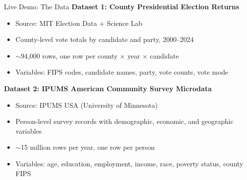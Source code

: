 \documentclass[aspectratio=169, 11pt]{beamer}
\begin{document}
\begin{frame}{Live Demo: The Data}
  \textbf{Dataset 1: County Presidential Election Returns}
  \begin{itemize}
    \item Source: MIT Election Data + Science Lab
    \item County-level vote totals by candidate and party, 2000--2024
    \item ${\sim}$94{,}000 rows, one row per county $\times$ year $\times$ candidate
    \item Variables: FIPS codes, candidate names, party, vote counts, vote mode
  \end{itemize}

  \vspace{0.5em}
  \textbf{Dataset 2: IPUMS American Community Survey Microdata}
  \begin{itemize}
    \item Source: IPUMS USA (University of Minnesota)
    \item Person-level survey records with demographic, economic, and geographic variables
    \item ${\sim}$15 million rows per year, one row per person
    \item Variables: age, education, employment, income, race, poverty status, county FIPS
  \end{itemize}
\end{frame}
\end{document}

